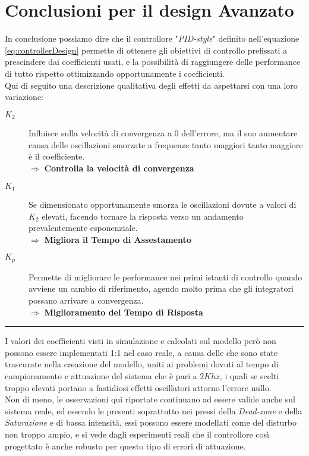 \section{Conclusioni per il design Avanzato} \label{sec:designControlloreConclusioni}
In conclusione possiamo dire che il controllore "\textit{PID-style}" definito nell'equazione \ref{eq:controllerDesign} permette di ottenere gli obiettivi di controllo prefissati a prescindere dai coefficienti usati, e la possibilità di raggiungere delle performance di tutto rispetto ottimizzando opportunamente i coefficienti.\\
Qui di seguito una descrizione qualitativa degli effetti da aspettarsi con una loro variazione:
\begin{description}
	\item[{\boldmath$ K_2 $}] Influisce sulla velocità di convergenza a 0 dell'errore, ma il suo aumentare causa delle oscillazioni smorzate a frequenze tanto maggiori tanto maggiore è il coefficiente. \\
	$\Rightarrow$ \textbf{Controlla la velocità di convergenza}
	\item[{\boldmath$ K_1 $}] Se dimensionato opportunamente smorza le oscillazioni dovute a valori di $ K_2 $ elevati, facendo tornare la risposta verso un andamento prevalentemente esponenziale.\\
	$\Rightarrow$ \textbf{Migliora il Tempo di Assestamento}
	\item[{\boldmath$ K_p $}] Permette di migliorare le performance nei primi istanti di controllo quando avviene un cambio di riferimento, agendo molto prima che gli integratori possano arrivare a convergenza.\\
	$\Rightarrow$ \textbf{Miglioramento del Tempo di Risposta}
\end{description} \vspace{-8mm}
\noindent
\begin{center}
	\rule{0.75\linewidth}{0.5px}
\end{center}\vspace{-4mm}
\noindent
I valori dei coefficienti visti in simulazione e calcolati sul modello però non possono essere implementati 1:1 nel caso reale, a causa delle \nonLinearita che sono state trascurate nella creazione del modello, uniti ai problemi dovuti al tempo di campionamento e attuazione del sistema che è pari a $ 2Khz $, i quali se scelti troppo elevati portano a fastidiosi effetti oscillatori attorno l'errore nullo.\\
Non di meno, le osservazioni qui riportate continuano ad essere valide anche sul sistema reale, ed essendo le \nonLinearita presenti soprattutto nei pressi della \textit{Dead-zone} e della \textit{Saturazione} e di bassa intensità, essi possono essere modellati come del disturbo non troppo ampio, e si vede dagli esperimenti reali che il controllore così progettato è anche robusto per questo tipo di errori di attuazione.



